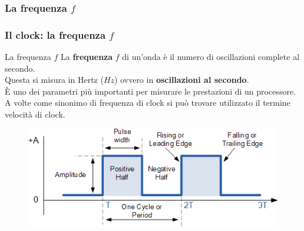 \subsubsection[La frequenza $f$]{La frequenza $f$}
\begin{frame}
	\frametitle{Il clock: la frequenza $f$}
	
	\begin{block}{La frequenza $f$}
		La \textbf{frequenza} $f$ di un'onda è il numero di oscillazioni complete al secondo.\\
		Questa si misura in Hertz ($Hz$) ovvero in \textbf{oscillazioni al secondo}.\\
		È uno dei parametri più importanti per misurare le prestazioni di un processore.\\
		A volte come sinonimo di frequenza di clock si può trovare utilizzato il termine velocità di clock.
	\end{block}
	
	
	\begin{figure}[!htbp]
		\centering 
		\includegraphics[width=0.78\linewidth]{images/2_le_architetture/clock.png}
	\end{figure}
	
\end{frame}


